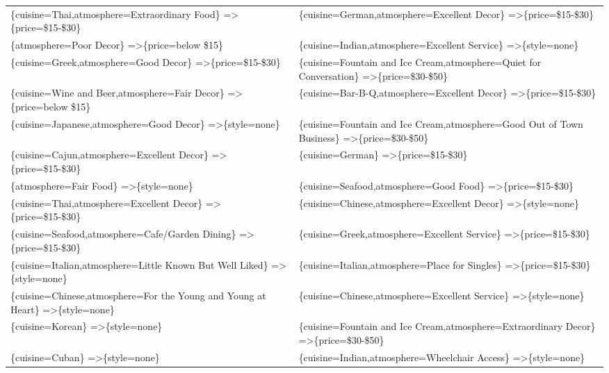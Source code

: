 \documentclass[letterpaper,10pt]{article}
\begin{document}
\begin{appendices}
\begin{table}[h]
\begin{adjustbox}{max width=\textwidth}
\begin{tabular}{ll}
\{cuisine=Thai,atmosphere=Extraordinary Food\} =\textgreater \{price=\$15-\$30\} & \{cuisine=German,atmosphere=Excellent Decor\} =\textgreater \{price=\$15-\$30\} \\ 
\{atmosphere=Poor Decor\} =\textgreater \{price=below \$15\} & \{cuisine=Indian,atmosphere=Excellent Service\} =\textgreater \{style=none\} \\ 
\{cuisine=Greek,atmosphere=Good Decor\} =\textgreater \{price=\$15-\$30\} & \{cuisine=Fountain and Ice Cream,atmosphere=Quiet for Conversation\} =\textgreater \{price=\$30-\$50\} \\ 
\{cuisine=Wine and Beer,atmosphere=Fair Decor\} =\textgreater \{price=below \$15\} & \{cuisine=Bar-B-Q,atmosphere=Excellent Decor\} =\textgreater \{price=\$15-\$30\} \\ 
\{cuisine=Japanese,atmosphere=Good Decor\} =\textgreater \{style=none\} & \{cuisine=Fountain and Ice Cream,atmosphere=Good Out of Town Business\} =\textgreater \{price=\$30-\$50\} \\ 
\{cuisine=Cajun,atmosphere=Excellent Decor\} =\textgreater \{price=\$15-\$30\} & \{cuisine=German\} =\textgreater \{price=\$15-\$30\} \\ 
\{atmosphere=Fair Food\} =\textgreater \{style=none\} & \{cuisine=Seafood,atmosphere=Good Food\} =\textgreater \{price=\$15-\$30\} \\ 
\{cuisine=Thai,atmosphere=Excellent Decor\} =\textgreater \{price=\$15-\$30\} & \{cuisine=Chinese,atmosphere=Excellent Decor\} =\textgreater \{style=none\} \\ 
\{cuisine=Seafood,atmosphere=Cafe/Garden Dining\} =\textgreater \{price=\$15-\$30\} & \{cuisine=Greek,atmosphere=Excellent Service\} =\textgreater \{price=\$15-\$30\} \\ 
\{cuisine=Italian,atmosphere=Little Known But Well Liked\} =\textgreater \{style=none\} & \{cuisine=Italian,atmosphere=Place for Singles\} =\textgreater \{price=\$15-\$30\} \\ 
\{cuisine=Chinese,atmosphere=For the Young and Young at Heart\} =\textgreater \{style=none\} & \{cuisine=Chinese,atmosphere=Excellent Service\} =\textgreater \{style=none\} \\ 
\{cuisine=Korean\} =\textgreater \{style=none\} & \{cuisine=Fountain and Ice Cream,atmosphere=Extraordinary Decor\} =\textgreater \{price=\$30-\$50\} \\ 
\{cuisine=Cuban\} =\textgreater \{style=none\} & \{cuisine=Indian,atmosphere=Wheelchair Access\} =\textgreater \{style=none\} \\ 

\end{tabular}
\end{adjustbox}
\end{table}
\end{appendices}
\end{document}
